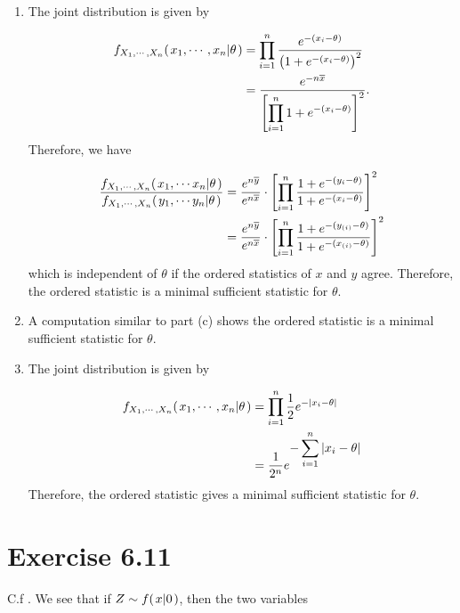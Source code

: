 \documentclass[12pt,letterpaper,reqno]{amsart}
\numberwithin{equation}{subsection}
\begin{document}
\begin{enumerate}[label=(\alph*),leftmargin=*]
    \item The joint distribution is given by
    
    \begin{align*}
        {f_{X_1, \cdots, X_n}}\! \left( {\left. {x_1, \cdots, x_n} \middle| {\theta} \right.} \right) &= \prod_{i=1}^n \frac{e^{-(x_i-\theta)}}{\left(1 + e^{-(x_i-\theta)} \right)^2} \\
        &= \frac{e^{-n \overline{{x}}}}{ \left[\displaystyle \prod_{i=1}^n 1 + e^{-(x_i - \theta)} \right]^2}.
    \end{align*}
    Therefore, we have
    
    \begin{align*}
         \frac{{f_{X_1, \cdots, X_n}}\! \left( {\left. {x_1, \cdots x_n} \middle| {\theta} \right.} \right)}{{f_{X_1, \cdots, X_n}}\! \left( {\left. {y_1, \cdots y_n} \middle| {\theta} \right.} \right)} &= \frac{e^{n \overline{{y}}}}{e^{n \overline{{x}}}} \cdot \left[ \prod_{i=1}^n \frac{1 + e^{-(y_i - \theta)}}{1 + e^{-(x_i - \theta)}} \right]^2 \\
         &= \frac{e^{n \overline{{y}}}}{e^{n \overline{{x}}}} \cdot \left[ \prod_{i=1}^n \frac{1 + e^{-(y_{(i)} - \theta)}}{1 + e^{-(x_{(i)} - \theta)}} \right]^2
    \end{align*}
    which is independent of $\theta$ if the ordered statistics of $x$ and $y$ agree. Therefore, the ordered statistic is a minimal sufficient statistic for $\theta$.
    
    \item A computation similar to part (c) shows the ordered statistic is a minimal sufficient statistic for $\theta$.
    
    \item The joint distribution is given by
    
    \begin{align*}
         {f_{X_1, \cdots, X_n}}\! \left( {\left. {x_1, \cdots, x_n} \middle| {\theta} \right.} \right) &= \prod_{i=1}^n \frac{1}{2} e^{-\left\lvert{x_i-\theta}\right\rvert} \\
         &= \frac{1}{2^n} e^{\displaystyle -\sum_{i=1}^n \left\lvert{x_i - \theta}\right\rvert}
    \end{align*}
    Therefore, the ordered statistic gives a minimal sufficient statistic for $\theta$.
    
\end{enumerate}

\newpage
\section{Exercise 6.11}

C.f \cite[Section 3.5]{Berger-Casella}. We see that if $Z \sim {f}\! \left( {\left. {x} \middle| {0} \right.} \right)$, then the two variables
\end{document}
